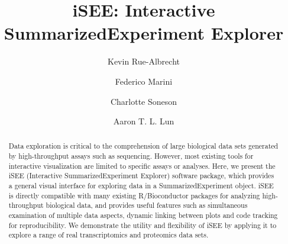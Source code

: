 \documentclass[10pt,a4paper,twocolumn]{article}
\begin{document}
\title{iSEE: Interactive SummarizedExperiment Explorer}
\author[1,$\dagger$]{Kevin Rue-Albrecht}
\author[2,3,$\dagger$]{Federico Marini}
\author[4,5,$\dagger$]{Charlotte Soneson}
\author[6,$\dagger$,$\ast$]{Aaron T. L. Lun}



\maketitle
\thispagestyle{fancy}


\begin{abstract}
Data exploration is critical to the comprehension of large biological data sets generated by high-throughput assays such as sequencing.
However, most existing tools for interactive visualization are limited to specific assays or analyses.
Here, we present the iSEE (Interactive SummarizedExperiment Explorer) software package, which provides a general visual interface for exploring data in a SummarizedExperiment object.
iSEE is directly compatible with many existing R/Bioconductor packages for analyzing high-throughput biological data,
and provides useful features such as simultaneous examination of multiple data aspects, dynamic linking between plots and code tracking for reproducibility.
We demonstrate the utility and flexibility of iSEE by applying it to explore a range of real transcriptomics and proteomics data sets.


\end{abstract}
\end{document}
